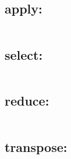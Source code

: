\subsection{{\sf apply}: }

\paragraph{\syntax}

\begin{verbatim}

\end{verbatim}


\subsection{{\sf select}: }

\paragraph{\syntax}

\begin{verbatim}

\end{verbatim}


\subsection{{\sf reduce}: }

\paragraph{\syntax}

\begin{verbatim}

\end{verbatim}


\subsection{{\sf transpose}: }

\paragraph{\syntax}

